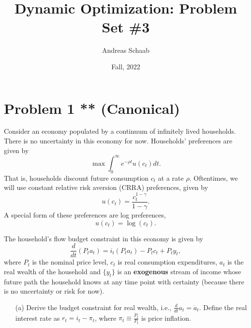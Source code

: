 \documentclass[11pt]{extarticle}
\title{Dynamic Optimization: Problem Set \#3}
\author{Andreas Schaab}
\date{Fall, 2022}
\theoremstyle{plain}
\theoremstyle{definition}
\begin{document}
\maketitle
\thispagestyle{empty}
\setcounter{page}{0}


\vspace{10mm}
\section*{Problem 1  ** (Canonical)}


Consider an economy populated by a continuum of infinitely lived households. There is no uncertainty in this economy for now. Households' preferences are given by
\begin{equation*}
	\max \int_0^\infty e^{-\rho t} u(c_t) dt.
\end{equation*}
That is, households discount future consumption $c_t$ at a rate $\rho$. Oftentimes, we will use constant relative risk aversion (CRRA) preferences, given by
\begin{equation*}
	u(c_t) = \frac{c_t^{1-\gamma}}{1-\gamma}.
\end{equation*}
A special form of these preferences are log preferences, 
\begin{equation*}
	u(c_t) = \log(c_t). 
\end{equation*}



The household's flow budget constraint in this economy is given by
\begin{equation*}
	\frac{d}{dt}(P_t a_t) = i_t (P_t a_t) - P_t c_t + P_t y_t,
\end{equation*}
where $P_t$ is the nominal price level, $c_t$ is real consumption expenditures, $a_t$ is the real wealth of the household and $\{y_t\}$ is an \textbf{exogenous} stream of income whose future path the household knows at any time point with certainty (because there is no uncertainty or risk for now).


\vspace{5mm}
\begin{enumerate}
\item [(a)] Derive the budget constraint for real wealth, i.e., $\frac{d}{dt} a_t = \dot a_t$. Define the real interest rate as $r_t = i_t - \pi_t$, where $\pi_t \equiv \frac{\dot P_t}{P_t}$ is price inflation.
\end{enumerate}
\end{document}
